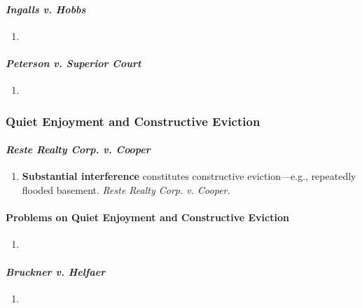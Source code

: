 \paragraph{\emph{Ingalls v. Hobbs}} %

\begin{enumerate}
    \item
\end{enumerate}

\paragraph{\emph{Peterson v. Superior Court}} %

\begin{enumerate}
    \item
\end{enumerate}

\subsubsection{Quiet Enjoyment and Constructive Eviction} %

\paragraph{\emph{Reste Realty Corp. v. Cooper}} %

\begin{enumerate}
    \item \textbf{Substantial interference} constitutes constructive 
    eviction---e.g., repeatedly flooded basement. \emph{Reste Realty Corp. v. 
    Cooper.}
\end{enumerate}

\paragraph{Problems on Quiet Enjoyment and Constructive Eviction}

\begin{enumerate}
    \item 
\end{enumerate}

\paragraph{\emph{Bruckner v. Helfaer}} %

\begin{enumerate}
    \item
\end{enumerate}

